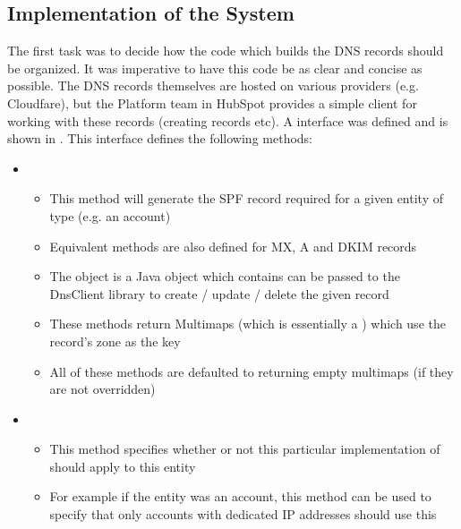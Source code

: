 \subsection{Implementation of the System}
The first task was to decide how the code which builds the DNS records should be organized. It was imperative to have this code be as clear and concise as possible. The DNS records themselves are hosted on various providers (e.g. Cloudfare), but the Platform team in HubSpot provides a simple client for working with these records (creating records etc). A  interface was defined and is shown in  . This interface defines the following methods:

\begin{itemize}

      \item{}
      \begin{itemize}
            \item{This method will generate the SPF record required for a given entity of type  (e.g. an account)}
            \item{Equivalent methods are also defined for MX, A and DKIM records}
            \item{The  object is a Java object which contains can be passed to the DnsClient library to create / update / delete the given record}
            \item{These methods return Multimaps (which is essentially a ) which use the record's zone as the key}
            \item{All of these methods are defaulted to returning empty multimaps (if they are not overridden)}
      \end{itemize}

      \item{}
      \begin{itemize}
            \item{This method specifies whether or not this particular implementation of  should apply to this entity}
            \item{For example if the entity was an account, this method can be used to specify that only accounts with dedicated IP addresses should use this }
      \end{itemize}


\end{itemize}
